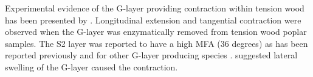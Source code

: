 Experimental evidence of the G-layer providing contraction within tension wood
has been presented by \cite{Goswami_2008}. Longitudinal extension and tangential
contraction were observed when the G-layer was enzymatically removed from
tension wood poplar samples. The S2 layer was reported to have a high MFA (36
degrees) as has been reported previously and for other G-layer producing species
\cite{M_ller_2006}. \cite{Goswami_2008} suggested lateral swelling of the G-layer caused the
contraction.
